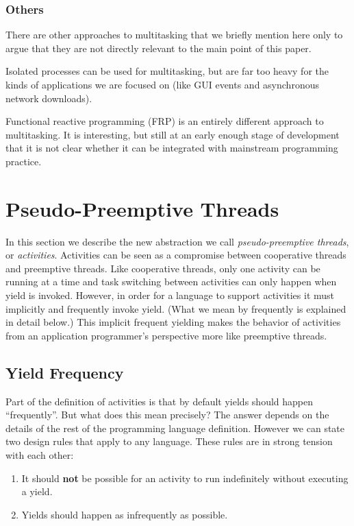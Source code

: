 \documentclass[10pt,preprint]{sigplanconf}
\begin{document}
\subsubsection{Others}

There are other approaches to multitasking that we briefly mention here only to argue that they are not directly relevant to the main point of this paper.

Isolated processes can be used for multitasking, but are far too heavy for the kinds of applications we are focused on (like GUI events and asynchronous network downloads).

Functional reactive programming (FRP) is an entirely different approach to multitasking.
It is interesting, but still at an early enough stage of development that it is not clear whether it can be integrated with mainstream programming practice.

\section{Pseudo-Preemptive Threads}

In this section we describe the new abstraction we call \emph{pseudo-preemptive threads}, or \emph{activities}.
Activities can be seen as a compromise between cooperative threads and preemptive threads.
Like cooperative threads, only one activity can be running at a time and task switching between activities can only happen when yield is invoked.
However, in order for a language to support activities it must implicitly and frequently invoke yield.
(What we mean by frequently is explained in detail below.)
This implicit frequent yielding makes the behavior of activities from an application programmer's perspective more like preemptive threads.

\subsection{Yield Frequency}

Part of the definition of activities is that by default yields should happen ``frequently''.
But what does this mean precisely?
The answer depends on the details of the rest of the programming language definition.
However we can state two design rules that apply to any language.
These rules are in strong tension with each other:

\begin{enumerate}
\item It should \textbf{not} be possible for an activity to run indefinitely without executing a yield.
\item Yields should happen as infrequently as possible.
\end{enumerate}
\end{document}
